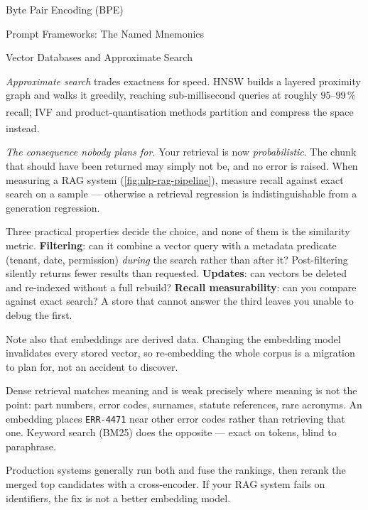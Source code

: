 \begin{v3topic}{Byte Pair Encoding (BPE)}
\begin{v3topic}{Prompt Frameworks: The Named Mnemonics}
\begin{v3topic}{Vector Databases and Approximate Search}
\begin{workedexample}
\emph{Approximate search} trades exactness for speed. HNSW builds a layered
proximity graph and walks it greedily, reaching sub-millisecond queries at
roughly $95\text{--}99\,\%$
recall\textsuperscript{\cite{malkovEfficientRobustApproximate2020}};
IVF and product-quantisation methods partition and compress the space
instead\textsuperscript{\cite{johnsonBillionscaleSimilaritySearch2021}}.

\emph{The consequence nobody plans for.} Your retrieval is now
\emph{probabilistic}. The chunk that should have been returned may simply not
be, and no error is raised. When measuring a RAG system
(\cref{fig:nlp-rag-pipeline}), measure recall against exact search on a sample
--- otherwise a retrieval regression is indistinguishable from a generation
regression.
\end{workedexample}

\begin{engineernote}
Three practical properties decide the choice, and none of them is the
similarity metric. \textbf{Filtering}: can it combine a vector query with a
metadata predicate (tenant, date, permission) \emph{during} the search rather
than after it? Post-filtering silently returns fewer results than requested.
\textbf{Updates}: can vectors be deleted and re-indexed without a full
rebuild? \textbf{Recall measurability}: can you compare against exact search?
A store that cannot answer the third leaves you unable to debug the first.

Note also that embeddings are derived data. Changing the embedding model
invalidates every stored vector, so re-embedding the whole corpus is a
migration to plan for, not an accident to discover.
\end{engineernote}

\begin{cautionbox}
Dense retrieval matches meaning and is weak precisely where meaning is not the
point: part numbers, error codes, surnames, statute references, rare acronyms.
An embedding places \texttt{ERR-4471} near other error codes rather than
retrieving that one. Keyword search (BM25) does the opposite --- exact on
tokens, blind to paraphrase.

Production systems generally run both and fuse the rankings, then rerank the
merged top candidates with a cross-encoder. If your RAG system fails on
identifiers, the fix is not a better embedding model.
\end{cautionbox}
\end{v3topic}


\end{v3topic}
\end{v3topic}
